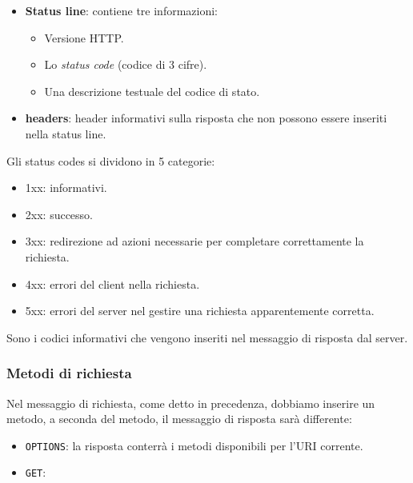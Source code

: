 \begin{itemize}
	\item \textbf{Status line}: contiene tre informazioni:
		\begin{itemize}
			\item Versione HTTP.
			\item Lo \emph{status code} (codice di 3 cifre).
			\item Una descrizione testuale del codice di stato.
		\end{itemize}
	\item \textbf{headers}: header informativi sulla risposta che non possono essere inseriti
		nella status line.
\end{itemize}
Gli status codes si dividono in 5 categorie:
\begin{itemize}
	\item 1xx: informativi.
	\item 2xx: successo.
	\item 3xx: redirezione ad azioni necessarie per completare correttamente la richiesta.
	\item 4xx: errori del client nella richiesta.
	\item 5xx: errori del server nel gestire una richiesta apparentemente corretta.
\end{itemize}
Sono i codici informativi che vengono inseriti nel messaggio di risposta dal server.

\subsubsection{Metodi di richiesta}
Nel messaggio di richiesta, come detto in precedenza, dobbiamo inserire un metodo, a seconda del 
metodo, il messaggio di risposta sarà differente:
\begin{itemize}
	\item \verb|OPTIONS|: la risposta conterrà i metodi disponibili per l'URI corrente.
	\item \verb|GET|: 
\end{itemize}
